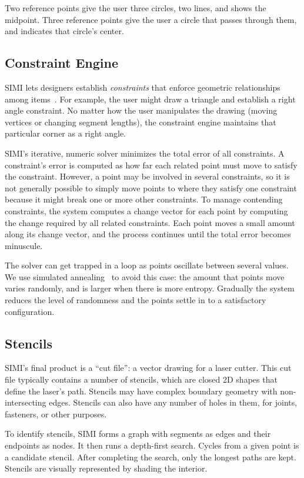 \documentclass{article}
\begin{document}
Two reference points give the user three circles, two lines, and shows
the midpoint. Three reference points give the user a circle that
passes through them, and indicates that circle's center.

\subsection{Constraint Engine}

SIMI lets designers establish \textit{constraints} that enforce
geometric relationships among items~\cite{borning-thinglab}. For
example, the user might draw a triangle and establish a right angle
constraint. No matter how the user manipulates the drawing (moving
vertices or changing segment lengths), the constraint engine maintains
that particular corner as a right angle.

SIMI's iterative, numeric solver minimizes the total error of all
constraints. A constraint's error is computed as how far each related
point must move to satisfy the constraint. However, a point may be
involved in several constraints, so it is not generally possible to
simply move points to where they satisfy one constraint because it
might break one or more other constraints. To manage contending
constraints, the system computes a change vector for each point by
computing the change required by all related constraints. Each point
moves a small amount along its change vector, and the process
continues until the total error becomes minuscule.

The solver can get trapped in a loop as points oscillate between
several values. We use simulated annealing~\cite{metropolis-annealing}
to avoid this case: the amount that points move varies randomly, and
is larger when there is more entropy. Gradually the system reduces the
level of randomness and the points settle in to a satisfactory
configuration.

\subsection{Stencils}

SIMI's final product is a ``cut file'': a vector drawing for a laser
cutter. This cut file typically contains a number of stencils, which
are closed 2D shapes that define the laser's path. Stencils may have
complex boundary geometry with non-intersecting edges. Stencils can
also have any number of holes in them, for joints, fasteners, or other
purposes.

To identify stencils, SIMI forms a graph with segments as edges and
their endpoints as nodes. It then runs a depth-first search. Cycles
from a given point is a candidate stencil. After completing the
search, only the longest paths are kept. Stencils are visually
represented by shading the interior.
\end{document}
